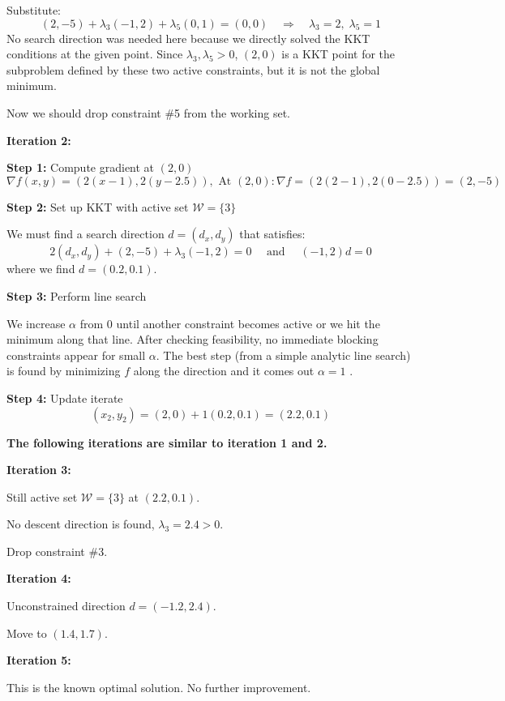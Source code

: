 \documentclass[12pt]{article}
\begin{document}
Substitute:
\[
    (2,-5)+\lambda_3(-1,2)+\lambda_5(0,1)=(0,0) \quad \Rightarrow \quad \lambda_3=2, \;\lambda_5=1
\]
No search direction was needed here because we directly solved the KKT conditions at the given point. Since $\lambda_3, \lambda_5 > 0$, $(2,0)$ is a KKT point for the subproblem defined by these two active constraints, but it is not the global minimum.

Now we should drop constraint \#5 from the working set.

\textbf{\large Iteration 2:}

\textbf{Step 1:}  Compute gradient at $(2,0)$
\[
    \nabla f(x, y)=(2(x-1), 2(y-2.5)), \text { At }(2,0): \nabla f=(2(2-1), 2(0-2.5))=(2,-5)
\]

\textbf{Step 2:}  Set up KKT with active set $\mathcal{W}=\{3\}$

We must find a search direction $d = (d_x, d_y)$ that satisfies:
\[
    2\left(d_x, d_y\right)+(2,-5)+\lambda_3(-1,2)=0 \quad \text { and } \quad(-1,2) d=0
\]
where we find $d = (0.2,0.1)$.

\textbf{Step 3:}  Perform line search

We increase $\alpha$ from $0$ until another constraint becomes active or we hit the minimum along that line. After checking feasibility, no immediate blocking constraints appear for small $\alpha$. The best step (from a simple analytic line search) is found by minimizing $f$ along the direction and it comes out $\alpha = 1$ .

\textbf{Step 4:}  Update iterate
\[
    (x_2, y_2)=(2,0)+1(0.2,0.1)=(2.2,0.1)
\]

\vspace{1cm}

\textbf{\large The following iterations are similar to iteration 1 and 2. }

\vspace{1cm}

\textbf{\large Iteration 3:}

Still active set $\mathcal{W}=\{3\}$ at $(2.2,0.1)$.

No descent direction is found, $\lambda_3 = 2.4 > 0$.

Drop constraint \#3.

\textbf{\large Iteration 4:}

Unconstrained direction $d = (-1.2,2.4)$.

Move to $(1.4,1.7)$.

\textbf{\large Iteration 5:}

This is the known optimal solution. No further improvement.
\end{document}
